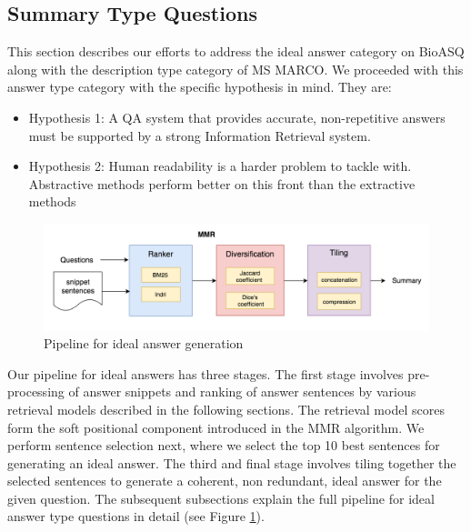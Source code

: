\subsection{Summary Type Questions}
\label{approach1}
This section describes our efforts to address the ideal answer category on BioASQ along with the description type category of MS MARCO. %
We proceeded with this answer type category with the specific hypothesis in mind. They are:
\begin{itemize}
\item Hypothesis 1: A QA system that provides accurate, non-repetitive answers must be supported by a strong Information Retrieval system.
\item Hypothesis 2: Human readability is a harder problem to tackle with. Abstractive methods perform better on this front than the extractive methods	\end{itemize}


 \begin{figure}
     \centering
     \includegraphics[scale=0.3]{images/pipeline_summary.png}
     \caption{Pipeline for ideal answer generation}
     \label{fig:ideal_answers_pipeline}
 \end{figure}

Our pipeline for ideal answers has three stages. The first stage involves pre-processing of answer snippets and ranking of answer sentences by various retrieval models described in the following sections. The retrieval model scores form the soft positional component introduced in the MMR algorithm. We perform sentence selection next, where we select the top 10 best sentences for generating an ideal answer. The third and final stage involves tiling together the selected sentences to generate a coherent, non redundant, ideal answer for the given question. 
The subsequent subsections explain the full pipeline for ideal answer type questions in detail (see Figure \ref{fig:ideal_answers_pipeline}).

